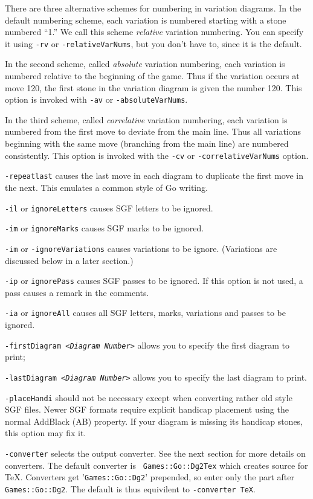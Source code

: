 There are three alternative schemes for numbering in variation diagrams.
In the default numbering scheme, each variation is numbered starting
with a stone numbered ``1.'' We call this scheme {\it relative} variation
numbering. You can specify it using {\tt -rv} or {\tt -relativeVarNums}, but
you don't have to, since it is the default.

In the second scheme, called {\it absolute} variation numbering, each
variation is numbered relative to the beginning of the game. Thus
if the variation occurs at move 120, the first stone in the variation
diagram is given the number 120. This option is invoked with {\tt -av} or 
{\tt -absoluteVarNums}.

In the third scheme, called {\it correlative} variation numbering, each
variation is numbered from the first move to deviate from the main line.
Thus all variations beginning with the same move (branching from the
main line) are numbered consistently. This option is invoked with
the {\tt -cv} or {\tt -correlativeVarNums} option.

{\tt -repeatlast} causes the last move in each diagram to duplicate the
first move in the next. This emulates a common style of Go writing.

{\tt -il} or {\tt ignoreLetters} causes SGF letters to be ignored.

{\tt -im} or {\tt ignoreMarks} causes SGF marks to be ignored.

{\tt -im} or {\tt -ignoreVariations} causes variations to be ignore.
(Variations are discussed below in a later section.)

{\tt -ip} or {\tt ignorePass} causes SGF passes to be ignored.
If this option is not used, a pass causes a remark in the comments.

{\tt -ia} or {\tt ignoreAll} causes all SGF letters, marks, variations
and passes to be ignored.

{\tt -firstDiagram <{\it Diagram Number}>} allows you to specify
the first diagram to print;

{\tt -lastDiagram <{\it Diagram Number}>} allows you to specify
the last diagram to print.

{\tt -placeHandi} should not be necessary except when converting rather
old style SGF files.  Newer SGF formats require explicit handicap placement
using the normal AddBlack (AB) property.  If your diagram is missing its
handicap stones, this option may fix it.

{\tt -converter} selects the output converter.  See the next section
for more details on converters.  The default converter is {\tt
Games::Go::Dg2Tex} which creates source for \TeX.  Converters get
'{\tt Games::Go::Dg2}' prepended, so enter only the part after {\tt Games::Go::Dg2}.
The default is thus equivilent to {\tt -converter TeX}.

